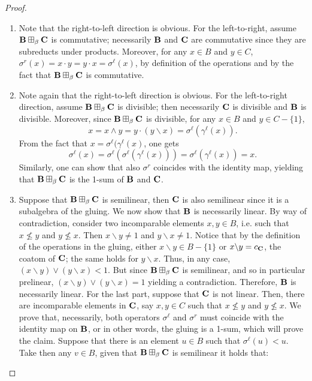\documentclass{amsart}
\theoremstyle{definition}
\numberwithin{equation}{section}
\newcommand{\join}{\vee}
\newcommand{\meet}{\wedge}
\newcommand{\alg}[1]{{\textbf{\upshape #1}}}  %
\newcommand{\sell}{\sigma^\ell}
\newcommand{\sr}{\sigma^r}
\newcommand{\gell}{\gamma^\ell}
\begin{document}
\begin{proof}
	\begin{enumerate}
		\item Note that the right-to-left direction is obvious. For the left-to-right, assume $\alg B \boxplus_\beta \alg C$ is commutative; necessarily $\alg B$ and $\alg C$ are commutative since they are subreducts under products. Moreover, for any  $x \in B$ and $y \in C$, $\sr(x)=x \cdot y = y \cdot x = \sell (x)$, by definition of the operations and by the fact that $\alg B \boxplus_\beta \alg C$ is commutative.
		\item Note again that the right-to-left direction is obvious. For the left-to-right direction, assume $\alg B \boxplus_\beta \alg C$ is divisible; then necessarily $\alg C$ is divisible and $\alg B$ is divisible. Moreover, since $\alg B \boxplus_\beta \alg C$ is divisible, for any $x \in B$ and $y \in C-\{1\}$, $$x=x \meet y = y \cdot (y \backslash x)= \sell(\gell(x)).$$ From the fact that $x= \sell(\gell(x)$, one gets $$\sell(x)=\sell(\sell(\gell(x)))=\sell(\gell(x))=x.$$ Similarly, one can show that also $\sr$ coincides with the identity map, yielding that $\alg B \boxplus_\beta \alg C$ is the 1-sum of $\alg B$ and $\alg C$.
		\item Suppose that $\alg B \boxplus_\beta \alg C$ is semilinear, then $\alg C$ is also semilinear since it is a subalgebra of the gluing. We now show that $\alg B$ is necessarily linear. By way of contradiction, consider two incomparable elements $x,y \in B$, i.e. such that $x \not \leq  y$ and $y \not \leq  x$. Then $x \backslash y \neq 1$ and $y \backslash x \neq 1$. Notice that by the definition of the operations in the gluing, either $x \backslash y \in B-\{1\}$ or $x \backslash y = c_{\alg C}$, the coatom of $\alg C$; the same holds for $y \backslash x$. Thus, in any case, $(x \backslash y) \join (y \backslash x) < 1$. But since $\alg B \boxplus_\beta \alg C$ is semilinear, and so in particular prelinear, $(x \backslash y) \join (y \backslash x)=1$ yielding a contradiction. Therefore, $\alg B$ is necessarily linear. For the last part, suppose that $\alg C$ is not linear. Then, there are incomparable elements in $\alg C$, say $x, y \in C$ such that $x \not \leq  y$ and $y \not \leq  x$. We prove that, necessarily, both operators $\sell$ and $\sr$ must coincide with the identity map on $\alg B$, or in other words, the gluing is a 1-sum, which will prove the claim. Suppose that there is an element $u \in B$ such that $\sell(u) < u$. Take then any $v \in B$, given that $\alg B \boxplus_\beta \alg C$ is semilinear it holds that:

\end{enumerate}
\end{proof}
\end{document}
